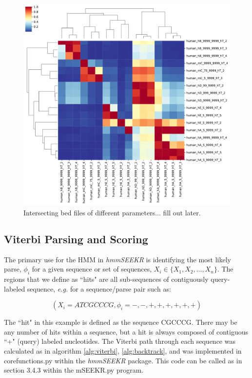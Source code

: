\begin{figure}[h]
\centering
\includegraphics[width=\textwidth]{images/intersection.pdf}
\caption{Intersecting bed files of different parameters... fill out later.}
\end{figure}

\subsection{Viterbi Parsing and Scoring}
The primary use for the HMM in \emph{hmmSEEKR} is identifying the most likely parse, $\phi_{i}$ for a given sequence or set of sequences, $X_i \in \{X_1,X_2,\dots,X_n\}$. The regions that we define as ``hits" are all sub-sequences of contiguously query-labeled sequence, \emph{e.g.} for a sequence/parse pair such as:

$$(X_i=ATCGCCCG,\phi_i=-,-,+,+,+,+,+,+)$$

The ``hit" in this example is defined as the sequence CGCCCG. There may be any number of hits within a sequence, but a hit is always composed of contiguous ``$+$" (query) labeled nucleotides.  The Viterbi path through each sequence was calculated as in algorithm \ref{alg:viterbi}, \ref{alg:backtrack}, and was implemented in corefunctions.py within the \emph{hmmSEEKR} package. This code can be called as in section 3.4.3 within the mSEEKR.py program.


